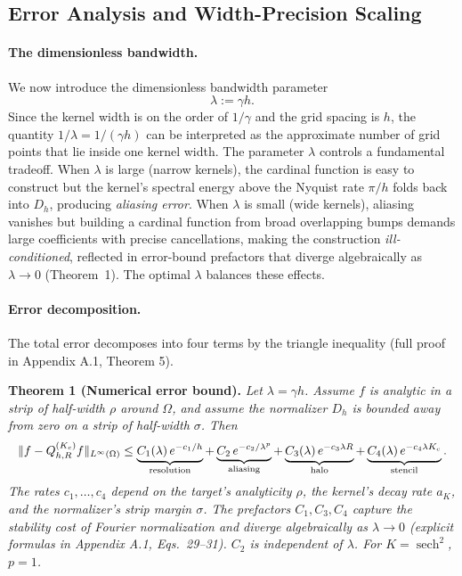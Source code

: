 \documentclass{article}
\begin{document}
\subsection{Error Analysis and Width-Precision Scaling}
\label{subsec:error-analysis}

\paragraph{The dimensionless bandwidth.}
We now introduce the dimensionless bandwidth parameter
\[
\lambda := \gamma h.
\]
Since the kernel width is on the order of \(1/\gamma\) and the grid spacing is \(h\), the quantity \(1/\lambda = 1/(\gamma h)\) can be interpreted as the approximate number of grid points that lie inside one kernel width. The parameter \(\lambda\) controls a fundamental tradeoff. When \(\lambda\) is large (narrow kernels), the cardinal function is easy to construct but the kernel's spectral energy above the Nyquist rate \(\pi/h\) folds back into \(D_h\), producing \emph{aliasing error}. When \(\lambda\) is small (wide kernels), aliasing vanishes but building a cardinal function from broad overlapping bumps demands large coefficients with precise cancellations, making the construction \emph{ill-conditioned}, reflected in error-bound prefactors that diverge algebraically as \(\lambda \to 0\) (Theorem~1). The optimal \(\lambda\) balances these effects.

\paragraph{Error decomposition.}
The total error decomposes into four terms by the triangle inequality (full proof in Appendix A.1, Theorem 5).

\medskip
\noindent\textbf{Theorem 1 (Numerical error bound).}
\emph{Let \(\lambda = \gamma h\). Assume \(f\) is analytic in a strip of half-width \(\rho\) around \(\Omega\), and assume the normalizer \(D_h\) is bounded away from zero on a strip of half-width \(\sigma\). Then}
\begin{equation}
\resizebox{\columnwidth}{!}{$\displaystyle
\|f - Q_{h,R}^{(K_c)} f\|_{L^\infty(\Omega)}
\le
\underbrace{C_1(\lambda)\, e^{-c_1/h}}_{\text{resolution}}
+
\underbrace{C_2\, e^{-c_2/\lambda^p}}_{\text{aliasing}}
+
\underbrace{C_3(\lambda)\, e^{-c_3 \lambda R}}_{\text{halo}}
+
\underbrace{C_4(\lambda)\, e^{-c_4 \lambda K_c}}_{\text{stencil}}.
$}
\label{eq:error-bound}
\end{equation}
\emph{The rates \(c_1, \ldots, c_4\) depend on the target's analyticity \(\rho\), the kernel's decay rate \(a_K\), and the normalizer's strip margin \(\sigma\). The prefactors \(C_1, C_3, C_4\) capture the stability cost of Fourier normalization and diverge algebraically as \(\lambda \to 0\) (explicit formulas in Appendix A.1, Eqs.~29--31). \(C_2\) is independent of \(\lambda\). For \(K = \operatorname{sech}^2\), \(p = 1\).}
\end{document}
